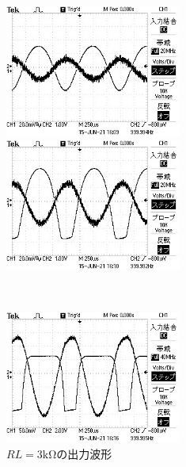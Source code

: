 \documentclass[a4paper,11pt]{jsarticle}
\begin{document}
\begin{figure}[H]
  \begin{center}
    \begin{minipage}{0.48\textwidth}
      \begin{center}
        \includegraphics[clip,width=5.8cm]{picture/3K_data/TEK0000.jpeg}
      \end{center}
    \end{minipage}
    \begin{minipage}{0.48\textwidth}
      \begin{center}
        \includegraphics[clip,width=5.8cm]{picture/3K_data/TEK0001.jpeg}
      \end{center}
    \end{minipage} \\
    \begin{minipage}{0.48\textwidth}
      \begin{center}
        \includegraphics[clip,width=5.8cm]{picture/3K_data/TEK0009.jpeg}
      \end{center}
    \end{minipage}
    \caption{$RL=3\si{\kilo \ohm}$の出力波形}
    \label{G:3Scope}
  \end{center}
\end{figure}
\end{document}
